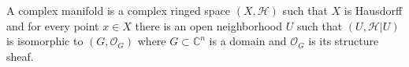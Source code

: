 A complex manifold is a complex ringed space $(X, \mathcal{H})$ such that $X$ is Hausdorff and for every point $x \in X$ there is an open neighborhood $U$ such that $(U, \mathcal{H}|U)$ is isomorphic to $(G, \mathcal{O}_G)$ where $G \subset \mathbb{C}^n$ is a domain and $\mathcal{O}_G$ is its structure sheaf.
